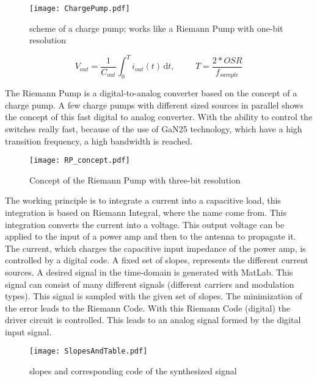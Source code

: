\begin{figure}[ht]
	\centering
  \texttt{[image: ChargePump.pdf]}
	\caption{scheme of a charge pump; works like a Riemann Pump with one-bit resolution}
	\label{fig:ChargePump}
\end{figure}

\begin{equation}
	V_{out} = \frac{1}{C_{out}}{ \int_0^T \! i_{out}(t) \, \mathrm{d}t} , \hspace{1cm} T = \frac{2*OSR}{f_{sample}}
\end{equation}

The Riemann Pump is a digital-to-analog converter based on the concept of a charge pump. A few charge pumps with different sized sources in parallel shows the concept of this fast digital to analog converter. With the ability to control the switches really fast, because of the use of GaN25 technology, which have a high transition frequency, a high bandwidth is reached.

\begin{figure}[ht]
	\centering
  \texttt{[image: RP\_concept.pdf]}
	\caption{Concept of the Riemann Pump with three-bit resolution}
	\label{fig:RiemannPumpConcept}
\end{figure}

 The working principle is to integrate a current into a capacitive load, this integration is based on Riemann Integral, where the name come from. This integration converts the current into a voltage. This output voltage can be applied to the input of a power amp and then to the antenna to propagate it. The current, which charges the capacitive input impedance of the power amp, is controlled by a digital code. A fixed set of slopes, represents the different current sources. A desired signal in the time-domain is generated with MatLab. This signal can consist of many different signals (different carriers and modulation types). This signal is sampled with the given set of slopes. The minimization of the error leads to the Riemann Code. With this Riemann Code (digital) the driver circuit is controlled. This leads to an analog signal formed by the digital input signal. 
 
\begin{figure}[ht]
	\centering
  \texttt{[image: SlopesAndTable.pdf]}
	\caption{slopes and corresponding code of the synthesized signal}
	\label{fig:SlopesAndTable}
\end{figure}

